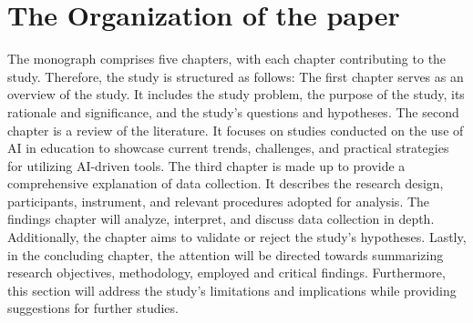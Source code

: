 \section{The Organization of the paper}\label{sec:the-organization-of-the-paper}
\justifying
The monograph comprises five chapters, with each chapter contributing to the study.
Therefore, the study is structured as follows: The first chapter serves as an overview of the study.
It includes the study problem, the purpose of the study, its rationale and significance, and the study's questions and hypotheses.
The second chapter is a review of the literature.
It focuses on studies conducted on the use of AI in education to showcase current trends, challenges, and practical strategies for utilizing AI-driven tools.
The third chapter is made up to provide a comprehensive explanation of data collection.
It describes the research design, participants,  instrument, and relevant procedures adopted for analysis.
The findings chapter will analyze, interpret, and discuss data collection in depth.
Additionally, the chapter aims to validate or reject the study's hypotheses.
Lastly, in the concluding chapter, the attention will be directed towards summarizing research objectives, methodology, employed and critical findings.
Furthermore, this section will address the study's limitations and implications while providing suggestions for further studies.




